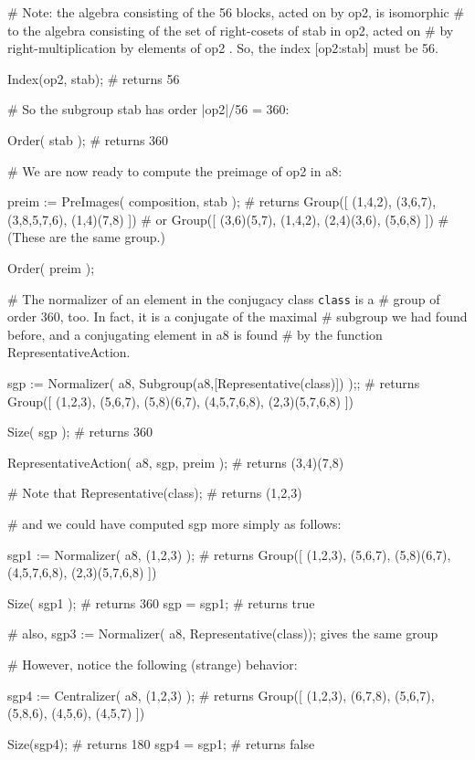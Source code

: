 # Note: the algebra consisting of the 56 blocks, acted on by op2, is isomorphic 
# to the algebra consisting of the set of right-cosets of stab in op2, acted on
# by right-multiplication by elements of op2 . So, the index [op2:stab] must be 56.

Index(op2, stab);  # returns 56

# So the subgroup stab has order |op2|/56 = 360:

Order( stab );   # returns 360

# We are now ready to compute the preimage of op2 in a8:

preim := PreImages( composition, stab );
# returns Group([ (1,4,2), (3,6,7), (3,8,5,7,6), (1,4)(7,8) ])
#      or Group([ (3,6)(5,7), (1,4,2), (2,4)(3,6), (5,6,8) ])
#      (These are the same group.)

Order( preim );

# The normalizer of an element in the conjugacy class {\tt class} is a 
# group of order 360, too. In fact, it is a conjugate of the maximal 
# subgroup we had found before, and a conjugating element in a8 is found 
# by the function RepresentativeAction.

sgp := Normalizer( a8, Subgroup(a8,[Representative(class)]) );;
# returns Group([ (1,2,3), (5,6,7), (5,8)(6,7), (4,5,7,6,8), (2,3)(5,7,6,8) ])

Size( sgp );       # returns 360

RepresentativeAction( a8, sgp, preim );  # returns (3,4)(7,8)

# Note that 
Representative(class);   # returns (1,2,3)
  
# and we could have computed sgp more simply as follows:

sgp1 := Normalizer( a8, (1,2,3) );
# returns Group([ (1,2,3), (5,6,7), (5,8)(6,7), (4,5,7,6,8), (2,3)(5,7,6,8) ])

Size( sgp1 );      # returns 360
sgp = sgp1;        # returns true

# also, sgp3 := Normalizer( a8, Representative(class)); gives the same group

# However, notice the following (strange) behavior:

sgp4 := Centralizer( a8, (1,2,3) );
# returns Group([ (1,2,3), (6,7,8), (5,6,7), (5,8,6), (4,5,6), (4,5,7) ])
  
Size(sgp4);        # returns 180
sgp4 = sgp1;       # returns false

























